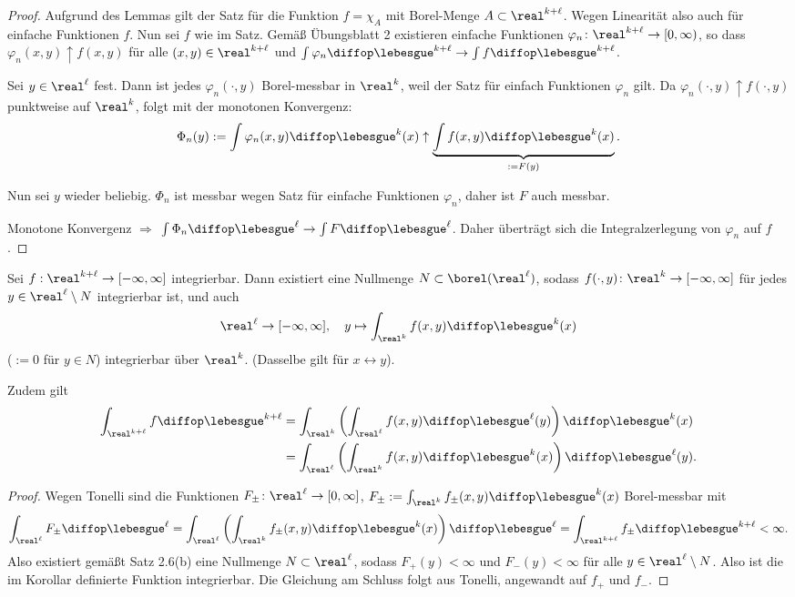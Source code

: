 \begin{proof}
 Aufgrund des Lemmas gilt der Satz für die Funktion $f = \chi_A$ mit Borel-Menge $A \subset \real^{k+\ell}$. Wegen Linearität also auch für einfache Funktionen $f$. Nun sei $f$ wie im Satz. Gemäß Übungsblatt 2 existieren einfache Funktionen $\varphi_n \colon \real^{k+\ell} \to [0, \infty)$, so dass $\varphi_n (x,y) \uparrow f(x,y)$ für alle $(x,y) \in \real^{k+\ell}$ und $\int \varphi_n \diffop \lebesgue^{k+\ell} \rightarrow \int f \diffop \lebesgue^{k+\ell}$.
 
 Sei $y \in \real^\ell$ fest. Dann ist jedes $\varphi_n(\cdot, y)$ Borel-messbar in $\real^k$, weil der Satz für einfach Funktionen $\varphi_n$ gilt. Da $\varphi_n(\cdot, y) \uparrow f( \cdot, y)$ punktweise auf $\real^k$, folgt mit der monotonen Konvergenz:
 \[ \Phi_n(y) := \int \varphi_n(x,y) \diffop \lebesgue^k (x) \uparrow \underbrace{\int f(x,y) \diffop \lebesgue^k (x)}_{:= F(y)}. \]
 
 Nun sei $y$ wieder beliebig. $\Phi_n$ ist messbar wegen Satz für einfache Funktionen $\varphi_n$, daher ist $F$ auch messbar.
 
 Monotone Konvergenz $\Rightarrow$ $\int \Phi_n \diffop \lebesgue^\ell \rightarrow \int F \diffop \lebesgue^\ell$. Daher überträgt sich die Integralzerlegung von $\varphi_n$ auf $f$.
\end{proof}

\begin{kor}[Fubini]
 Sei $f:\real^{k+\ell} \to [-\infty,\infty]$ integrierbar. Dann existiert eine Nullmenge $N \subset \borel(\real^\ell)$, sodass $f(\cdot, y)\colon\real^k \to [-\infty, \infty]$ für jedes $y \in \real^\ell \setminus N$ integrierbar ist, und auch 
 \[ \real^\ell \to [-\infty, \infty],\quad y \mapsto \int_{\real^k} f(x,y) \diffop \lebesgue^k (x) \]
 ($:= 0$ für $y \in N$) integrierbar über $\real^k$. (Dasselbe gilt für $x \leftrightarrow y$).
 
 Zudem gilt
 \[ \begin{aligned}
    \int_{\real^{k+\ell}} f \diffop \lebesgue^{k+\ell} 
    &= \int_{\real^k} \left( \int_{\real^\ell} f(x,y)  \diffop \lebesgue^\ell (y) \right) \diffop \lebesgue^k(x) \\
    &= \int_{\real^\ell} \left( \int_{\real^k} f(x,y)  \diffop \lebesgue^k (x) \right) \diffop \lebesgue^\ell(y).
    \end{aligned} \]
\end{kor}

\begin{proof}
 Wegen Tonelli sind die Funktionen $F_\pm\colon\real^\ell \to [0,\infty]$, $F_\pm := \int_{\real^k} f_\pm (x,y) \diffop \lebesgue^k(x)$ Borel-messbar mit 
 \[ \int_{\real^\ell} F_\pm \diffop \lebesgue^\ell = \int_{\real^\ell} \left( \int_{\real^k} f_\pm (x,y) \diffop \lebesgue^k(x) \right) \diffop \lebesgue^\ell = \int_{\real^{k+\ell}} f_\pm \diffop \lebesgue^{k+\ell} < \infty. \]
 Also existiert gemäßt Satz 2.6(b) eine Nullmenge $N \subset \real^\ell$, sodass $F_+(y) < \infty$ und $F_-(y) < \infty$ für alle $y \in \real^\ell \setminus N$. Also ist die im Korollar definierte Funktion integrierbar. Die Gleichung am Schluss folgt aus Tonelli, angewandt auf $f_+$ und $f_-$.
\end{proof}

